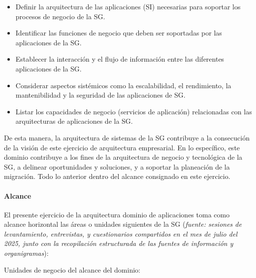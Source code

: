 \documentclass[
	a4paper, %
	12pt, %
]{include/CSSullivanBusinessReport}
\def\tightlist{}
\begin{document}
\begin{itemize}
\tightlist
\item
  Definir la arquitectura de las aplicaciones (SI) necesarias para
  soportar los procesos de negocio de la SG.
\item
  Identificar las funciones de negocio que deben ser soportadas por las
  aplicaciones de la SG.
\item
  Establecer la interacción y el flujo de información entre las
  diferentes aplicaciones de la SG.
\item
  Considerar aspectos sistémicos como la escalabilidad, el rendimiento,
  la mantenibilidad y la seguridad de las aplicaciones de SG.
\item
  Listar los capacidades de negocio (servicios de aplicación)
  relacionadas con las arquitecturas de aplicaciones de la SG.
\end{itemize}

De esta manera, la arquitectura de sistemas de la SG contribuye a la
consecución de la visión de este ejercicio de arquitectura empresarial.
En lo específico, este dominio contribuye a los fines de la arquitectura
de negocio y tecnológica de la SG, a delinear oportunidades y
soluciones, y a soportar la planeación de la migración. Todo lo anterior
dentro del alcance consignado en este ejercicio.

\paragraph{Alcance}\label{sec:alcance}

El presente ejercicio de la arquitectura dominio de aplicaciones toma
como alcance horizontal las áreas o unidades siguientes de la SG
(\emph{fuente: sesiones de levantamiento, entrevistas, y cuestionarios
compartidos en el mes de julio del 2025, junto con la recopilación
estructurada de las fuentes de información y organigramas}):

Unidades de negocio del alcance del dominio:
\end{document}
